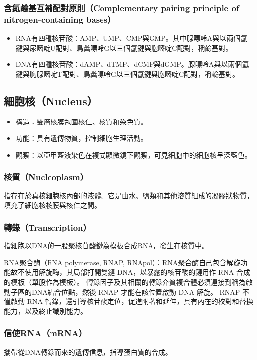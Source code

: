 \documentclass[a4paper,12pt]{report}
\begin{document}
\subsubsection{含氮鹼基互補配對原則（Complementary pairing principle of nitrogen-containing bases）}
\begin{itemize}
\item RNA有四種核苷酸：AMP、UMP、CMP與GMP。其中腺嘌呤A與以兩個氫鍵與尿嘧啶U配對、鳥糞嘌呤G以三個氫鍵與胞嘧啶C配對，稱鹼基對。
\item DNA有四種核苷酸：dAMP、dTMP、dCMP與dGMP。腺嘌呤A與以兩個氫鍵與胸腺嘧啶T配對、鳥糞嘌呤G以三個氫鍵與胞嘧啶C配對，稱鹼基對。
\end{itemize}
\bct\bfH\ctr{}\ef\FB\ect
\bct\bfH\ctr{}\ef\FB\ect
\bct\bfH\ctr{}\ef\FB\ect
\subsection{細胞核（Nucleus）}
\begin{itemize}
  \item 構造：雙層核膜包圍核仁、核質和染色質。
  \item 功能：具有遺傳物質，控制細胞生理活動。
  \item 觀察：以亞甲藍液染色在複式顯微鏡下觀察，可見細胞中的細胞核呈深藍色。
\end{itemize}
\subsubsection{核質（Nucleoplasm）}
指存在於真核細胞核內部的液體。它是由水、鹽類和其他溶質組成的凝膠狀物質，填充了細胞核核膜與核仁之間。
\subsubsection{轉錄（Transcription）}
指細胞以DNA的一股聚核苷酸鏈為模板合成RNA，發生在核質中。

RNA聚合酶（RNA polymerase, RNAP, RNApol）：RNA聚合酶自己包含解旋功能故不使用解旋酶，其局部打開雙鏈 DNA，以暴露的核苷酸的鏈用作 RNA 合成的模板（單股作為模板）。 轉錄因子及其相關的轉錄介質複合體必須連接到稱為啟動子區的DNA結合位點，然後 RNAP 才能在該位置啟動 DNA 解旋。 RNAP 不僅啟動 RNA 轉錄，還引導核苷酸定位，促進附著和延伸，具有內在的校對和替換能力，以及終止識別能力。
\subsubsection{信使RNA（mRNA）}
攜帶從DNA轉錄而來的遺傳信息，指導蛋白質的合成。
\end{document}
